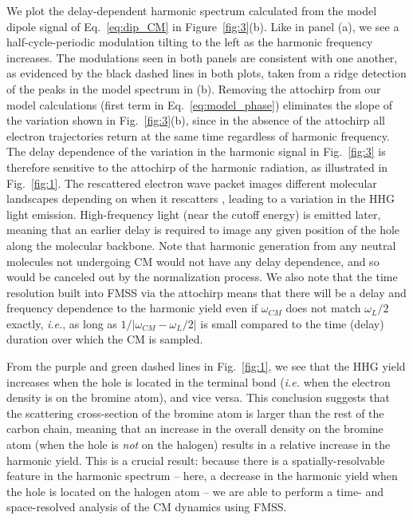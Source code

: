 \documentclass[journal=jacsat,manuscript=article]{achemso}
\begin{document}
We plot the delay-dependent harmonic spectrum calculated from the model dipole signal of Eq.~{\ref{eq:dip_CM}} in Figure~{\ref{fig:3}}(b). Like in panel (a), we see a half-cycle-periodic modulation tilting to the left as the harmonic frequency increases. The modulations seen in both panels are consistent with one another, as evidenced by the black dashed lines in both plots, taken from a ridge detection of the peaks in the model spectrum in (b). Removing the attochirp from our model calculations (first term in Eq.~{\ref{eq:model_phase}}) eliminates the slope of the variation shown in Fig.~{\ref{fig:3}}(b), since in the absence of the attochirp all electron trajectories return at the same time regardless of harmonic frequency. The delay dependence of the variation in the harmonic signal in Fig.~{\ref{fig:3}} is therefore sensitive to the attochirp of the harmonic radiation, as illustrated in Fig.~{\ref{fig:1}}. The rescattered electron wave packet images different molecular landscapes depending on when it rescatters \cite{varju2005, niikura2005, smirnova2009, dudovich2006, azoury2017}, leading to a variation in the HHG light emission. High-frequency light (near the cutoff energy) is emitted later, meaning that an earlier delay is required to image any given position of the hole along the molecular backbone. Note that harmonic generation from any neutral molecules not undergoing CM would not have any delay dependence, and so would be canceled out by the normalization process. We also note that the time resolution built into FMSS via the attochirp means that there will be a delay and frequency dependence to the harmonic yield even if $\omega_{CM}$ does not match $\omega_{L}/2$ exactly, {\it i.e.}, as long as $1/|\omega_{CM}-\omega_{L}/2|$ is small compared to the time (delay) duration over which the CM is sampled.

From the purple and green dashed lines in Fig.~{\ref{fig:1}}, we see that the HHG yield increases when the hole is located in the terminal bond (\emph{i.e.} when the electron density is on the bromine atom), and vice versa. This conclusion suggests that the scattering cross-section of the bromine atom is larger than the rest of the carbon chain, meaning that an increase in the overall density on the bromine atom (when the hole is \emph{not} on the halogen) results in a relative increase in the harmonic yield. This is a crucial result: because there is a spatially-resolvable feature in the harmonic spectrum -- here, a decrease in the harmonic yield when the hole is located on the halogen atom -- we are able to perform a time- and space-resolved analysis of the CM dynamics using FMSS.
\end{document}

